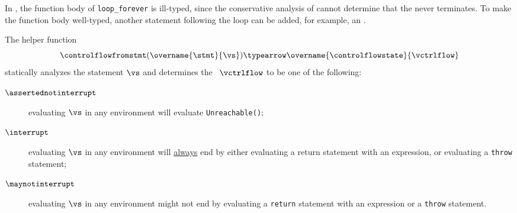 In , the function body of \verb|loop_forever|
is ill-typed, since the conservative analysis of 
cannot determine that the \whilestatementterm{} never terminates.
To make the function body well-typed, another statement following the loop
can be added, for example, an \unreachablestatementterm.

\hypertarget{def-controlflowfromstmt}{}
The helper function
\[
  \controlflowfromstmt(\overname{\stmt}{\vs})
  \typearrow \overname{\controlflowstate}{\vctrlflow}
\]
statically analyzes the statement $\vs$
and determines the \controlflowsymbolterm\ $\vctrlflow$ to be one of the following:
\hypertarget{def-assertednotinterrupt}{}
\begin{description}
  \item[$\assertednotinterrupt$] evaluating $\vs$ in any environment will evaluate \texttt{Unreachable()};
  \hypertarget{def-interrupt}{}
  \item[$\interrupt$] evaluating $\vs$ in any environment will \underline{always} end by either evaluating
      a return statement with an expression,
      or evaluating a \texttt{throw} statement;
  \hypertarget{def-maynotinterrupt}{}
  \item[$\maynotinterrupt$] evaluating $\vs$ in any environment might not end by evaluating
      a \texttt{return} statement with an expression or a \texttt{throw} statement.
\end{description}

